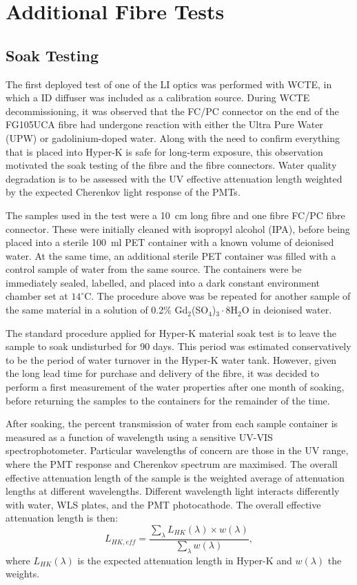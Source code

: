\documentclass[a4paper,11pt]{article}
\newcommand{\hk}{Hyper-K\xspace}
\begin{document}
\section{Additional Fibre Tests}\label{sec:tests}

\subsection{Soak Testing}\label{sec:tests:sub:soak}

The first deployed test of one of the LI optics was performed with WCTE, in which a ID diffuser was included as a calibration source. During WCTE decommissioning, it was observed that the FC/PC connector on the end of the FG105UCA fibre had undergone reaction with either the Ultra Pure Water (UPW) or gadolinium-doped water. Along with the need to confirm everything that is placed into Hyper-K is safe for long-term exposure, this observation motivated the soak testing of the fibre and the fibre connectors. Water quality degradation is to be assessed with the UV effective attenuation length weighted by the expected Cherenkov light response of the PMTs.

The samples used in the test were a 10~cm long fibre and one fibre FC/PC fibre connector. These were initially cleaned with isopropyl alcohol (IPA), before being  placed into a sterile 100~ml PET container with a known volume of deionised water. At the same time, an additional sterile PET container was filled with a control sample of water from the same source. The containers were be immediately sealed, labelled, and placed into a dark constant environment chamber set at $14^\circ$C. The procedure above was be repeated for another sample of the same material in a solution of 0.2\% Gd$_2$(SO$_4$)$_3\cdot$8H$_2$O in deionised water.

The standard procedure applied for \hk material soak test is to leave the sample to soak undisturbed for 90 days. This period was estimated conservatively to be the period of water turnover in the \hk water tank. However, given the long lead time for purchase and delivery of the fibre, it was decided to perform a first measurement of the water properties after one month of soaking, before returning the samples to the containers for the remainder of the time.

After soaking, the percent transmission of water from each sample container is measured as a function of wavelength using a sensitive UV-VIS spectrophotometer. Particular wavelengths of concern are those in the UV range, where the PMT response and Cherenkov spectrum are maximised. The overall effective attenuation length of the sample is the weighted average of attenuation lengths at different wavelengths. Different wavelength light interacts differently with water, WLS plates, and the PMT photocathode. The overall effective attenuation length is then:
\begin{equation}
L_{HK,eff} = \frac{\sum_{\lambda} L_{HK}\left(\lambda\right)\times w\left(\lambda\right)}{\sum_{\lambda} w\left(\lambda\right)},
\end{equation}
where $L_{HK}(\lambda)$ is the expected attenuation length in \hk and $w(\lambda)$ the weights.
\end{document}
